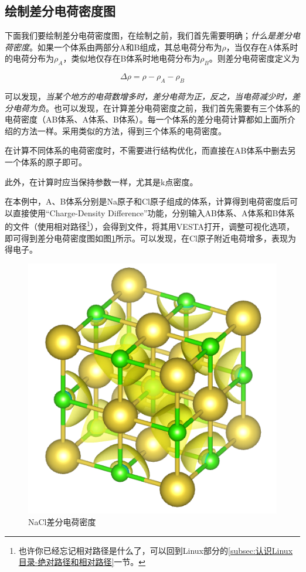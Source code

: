 \subsection{绘制差分电荷密度图}\label{subsec:电荷密度与差分电荷密度-绘制差分电荷密度图}

下面我们要绘制差分电荷密度图，在绘制之前，我们首先需要明确；\emph{什么是差分电荷密度}。如果一个体系由两部分A和B组成，其总电荷分布为$\rho$，当仅存在A体系时的电荷分布为$\rho_A$，类似地仅存在B体系时地电荷分布为$\rho_B$。则差分电荷密度定义为

\begin{equation*}
    \Delta\rho = \rho - \rho_A - \rho_B
\end{equation*}

可以发现，\emph{当某个地方的电荷数增多时，差分电荷为正，反之，当电荷减少时，差分电荷为负}。也可以发现，在计算差分电荷密度之前，我们首先需要有三个体系的电荷密度（AB体系、A体系、B体系）。每一个体系的差分电荷计算都如上面所介绍的方法一样。采用类似的方法，得到三个体系的电荷密度。

\begin{attention}
    在计算不同体系的电荷密度时，不需要进行结构优化，而直接在AB体系中删去另一个体系的原子即可。

    此外，在计算时应当保持参数一样，尤其是k点密度。
\end{attention}

在本例中，A、B体系分别是Na原子和Cl原子组成的体系，计算得到电荷密度后可以直接使用“Charge-Density Difference”功能，分别输入AB体系、A体系和B体系的文件（使用相对路径\footnote{也许你已经忘记相对路径是什么了，可以回到Linux部分的\ref{subsec:认识Linux目录-绝对路径和相对路径}一节。}），会得到文件，将其用VESTA打开，调整可视化选项，即可得到差分电荷密度图如图\ref{fig:电荷密度与差分电荷密度-NaCl差分电荷密度}所示。可以发现，在Cl原子附近电荷增多，表现为得电子。

\begin{figure}
    \centering
    \includegraphics[width=0.7\linewidth]{VASP计算/静态自洽与电荷密度/电荷密度与差分电荷密度/fig/NaCl差分电荷密度.png}
    \caption{NaCl差分电荷密度}
    \label{fig:电荷密度与差分电荷密度-NaCl差分电荷密度}
\end{figure}

